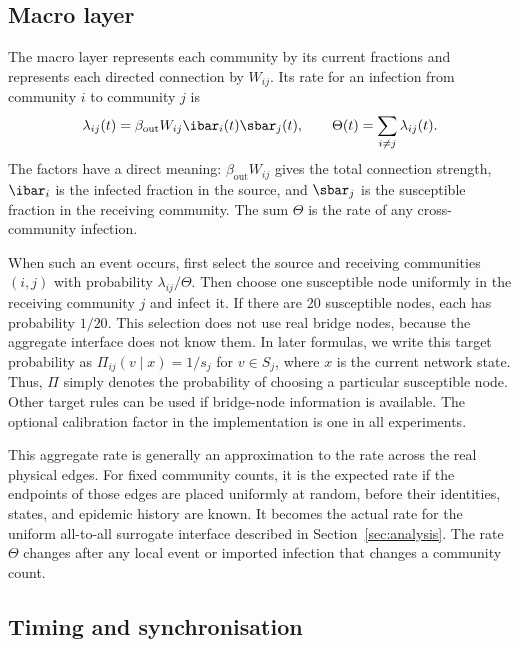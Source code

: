 \subsection{Macro layer}
\label{sec:macro}

The macro layer represents each community by its current fractions and represents each directed connection by $W_{ij}$. Its rate for an infection from community $i$ to community $j$ is
\begin{equation}
\label{eq:macro_rate}
\lambda_{ij}(t)=\beta_{\mathrm{out}}W_{ij}\ibar_i(t)\sbar_j(t),
\qquad
\Theta(t)=\sum_{i\neq j}\lambda_{ij}(t).
\end{equation}
The factors have a direct meaning: $\beta_{\mathrm{out}}W_{ij}$ gives the total connection strength, $\ibar_i$ is the infected fraction in the source, and $\sbar_j$ is the susceptible fraction in the receiving community. The sum $\Theta$ is the rate of any cross-community infection.

When such an event occurs, first select the source and receiving communities $(i,j)$ with probability $\lambda_{ij}/\Theta$. Then choose one susceptible node uniformly in the receiving community $j$ and infect it. If there are 20 susceptible nodes, each has probability $1/20$. This selection does not use real bridge nodes, because the aggregate interface does not know them. In later formulas, we write this target probability as $\Pi_{ij}(v\mid x)=1/s_j$ for $v\in S_j$, where $x$ is the current network state. Thus, $\Pi$ simply denotes the probability of choosing a particular susceptible node. Other target rules can be used if bridge-node information is available. The optional calibration factor in the implementation is one in all experiments.

This aggregate rate is generally an approximation to the rate across the real physical edges. For fixed community counts, it is the expected rate if the endpoints of those edges are placed uniformly at random, before their identities, states, and epidemic history are known. It becomes the actual rate for the uniform all-to-all surrogate interface described in Section~\ref{sec:analysis}. The rate $\Theta$ changes after any local event or imported infection that changes a community count.

\subsection{Timing and synchronisation}
\label{sec:timing}


